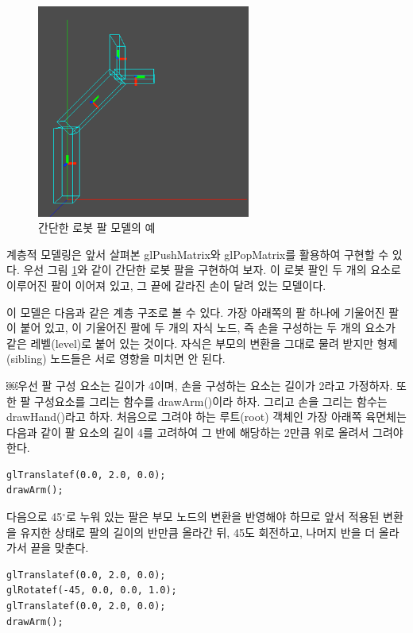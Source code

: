 \begin{figure}[h!]
  \centering
    \includegraphics[height=7cm]{OGL_transform/robotArm.png}
    \caption{간단한 로봇 팔 모델의 예}
    \label{fig:OGL_transform:robotArm}
\end{figure}

계층적 모델링은 앞서 살펴본 {\sf glPushMatrix}와 {\sf glPopMatrix}를 활용하여 구현할 수 있다. 우선 그림 \ref{fig:OGL_transform:robotArm}와 같이 간단한 로봇 팔을 구현하여 보자. 이 로봇 팔인 두 개의 요소로 이루어진 팔이 이어져 있고, 그 끝에 갈라진 손이 달려 있는 모델이다.

이 모델은 다음과 같은 계층 구조로 볼 수 있다. 가장 아래쪽의 팔 하나에 기울어진 팔이 붙어 있고, 이 기울어진 팔에 두 개의 자식 노드, 즉 손을 구성하는 두 개의 요소가 같은 레벨(level)로 붙어 있는 것이다. 자식은 부모의 변환을 그대로 물려 받지만 형제(sibling) 노드들은 서로 영향을 미치면 안 된다. 

￼우선 팔 구성 요소는 길이가 4이며, 손을 구성하는 요소는 길이가 2라고 가정하자. 또한 팔 구성요소를 그리는 함수를 {\sf drawArm()}이라 하자.
그리고 손을 그리는 함수는 {\sf drawHand()}라고 하자. 처음으로 그려야 하는 루트(root) 객체인 가장 아래쪽 육면체는 다음과 같이 팔 요소의 길이 4를 고려하여 
그 반에 해당하는 2만큼 위로 올려서 그려야 한다.

\begin{verbatim}
glTranslatef(0.0, 2.0, 0.0);
drawArm();
\end{verbatim}

다음으로 45$^{\circ}$로 누워 있는 팔은 부모 노드의 변환을 반영해야 하므로 앞서 적용된 변환을 유지한 상태로 팔의 길이의 반만큼 올라간 뒤, 45도 회전하고, 나머지 반을 더 올라가서 끝을 맞춘다.

\begin{verbatim}
glTranslatef(0.0, 2.0, 0.0);
glRotatef(-45, 0.0, 0.0, 1.0);
glTranslatef(0.0, 2.0, 0.0);
drawArm();
\end{verbatim}

